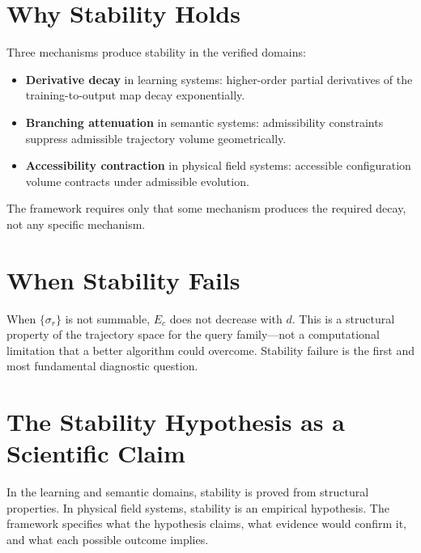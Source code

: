 \section{Why Stability Holds}

Three mechanisms produce stability in the verified domains:
\begin{itemize}
  \item \textbf{Derivative decay} in learning systems: higher-order partial derivatives of the training-to-output map decay exponentially.
  \item \textbf{Branching attenuation} in semantic systems: admissibility constraints suppress admissible trajectory volume geometrically.
  \item \textbf{Accessibility contraction} in physical field systems: accessible configuration volume contracts under admissible evolution.
\end{itemize}
The framework requires only that some mechanism produces the required decay, not any specific mechanism.

\section{When Stability Fails}

When $\{\sigma_r\}$ is not summable, $E_c$ does not decrease with $d$. This is a structural property of the trajectory space for the query family---not a computational limitation that a better algorithm could overcome. Stability failure is the first and most fundamental diagnostic question.

\section{The Stability Hypothesis as a Scientific Claim}

In the learning and semantic domains, stability is proved from structural properties. In physical field systems, stability is an empirical hypothesis. The framework specifies what the hypothesis claims, what evidence would confirm it, and what each possible outcome implies.

